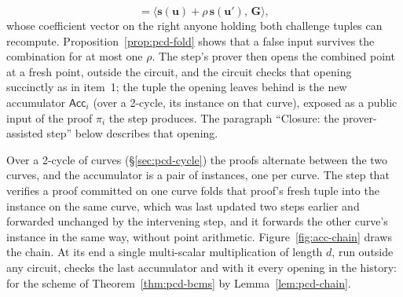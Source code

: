 \documentclass[11pt,a4paper]{article}
\theoremstyle{definition}
\newcommand{\ip}[2]{\langle #1,\, #2 \rangle}
\newcommand{\Acc}{\ensuremath{\mathsf{Acc}}}
\begin{document}
\begin{enumerate}[leftmargin=*, itemsep=2pt]
\begin{equation}
   = \ip{\mathbf s(\mathbf u) + \rho\,\mathbf s(\mathbf u')}{\mathbf G},
  \end{equation}
  whose coefficient vector on the right anyone holding both challenge
  tuples can recompute. Proposition~\ref{prop:pcd-fold} shows that a
  false input survives the combination for at most one $\rho$. The
  step's prover then opens the combined point at a fresh point, outside
  the circuit, and the circuit checks that opening succinctly as in
  item~1; the tuple the opening leaves behind is the new accumulator
  $\Acc_i$ (over a 2-cycle, its instance on that curve), exposed as a
  public input of the proof $\pi_i$ the step produces. The paragraph
  ``Closure: the prover-assisted step'' below describes that opening.
\end{enumerate}
Over a 2-cycle of curves (\S\ref{sec:pcd-cycle}) the proofs alternate
between the two curves, and the accumulator is a pair of instances, one
per curve. The step that verifies a proof committed on one curve folds
that proof's fresh tuple into the instance on the same curve, which was
last updated two steps earlier and forwarded unchanged by the
intervening step, and it forwards the other curve's instance in the
same way, without point arithmetic.
Figure~\ref{fig:acc-chain} draws the chain. At its end a single
multi-scalar multiplication of length $d$, run outside any circuit,
checks the last accumulator and with it every opening in the history:
for the scheme of Theorem~\ref{thm:pcd-bcms} by
Lemma~\ref{lem:pcd-chain}.
\end{document}
